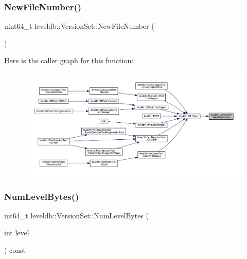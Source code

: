 \subsubsection{\texorpdfstring{NewFileNumber()}{NewFileNumber()}}
{\footnotesize\ttfamily uint64\+\_\+t leveldb\+::\+Version\+Set\+::\+New\+File\+Number (\begin{DoxyParamCaption}{ }\end{DoxyParamCaption})\hspace{0.3cm}{\ttfamily [inline]}}

Here is the caller graph for this function\+:
\nopagebreak
\begin{figure}[H]
\begin{center}
\leavevmode
\includegraphics[width=350pt]{classleveldb_1_1_version_set_ac4086c848479e74c1d9eb95e250e7167_icgraph}
\end{center}
\end{figure}
\mbox{\label{classleveldb_1_1_version_set_a02d41742ab464b83e06c7ab347db2126}} 
\subsubsection{\texorpdfstring{NumLevelBytes()}{NumLevelBytes()}}
{\footnotesize\ttfamily int64\+\_\+t leveldb\+::\+Version\+Set\+::\+Num\+Level\+Bytes (\begin{DoxyParamCaption}\item[{int}]{level }\end{DoxyParamCaption}) const}

